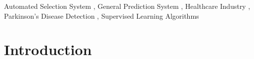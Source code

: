 \documentclass[a4paper,fleqn]{cas-dc}
\begin{document}


\begin{keywords}
    Automated Selection System \sep
    General Prediction System \sep
    Healthcare Industry \sep
    Parkinson's Disease Detection \sep
    Supervised Learning Algorithms
\end{keywords}


\maketitle



\section{Introduction}\label{sec:introduciton}
\end{document}

